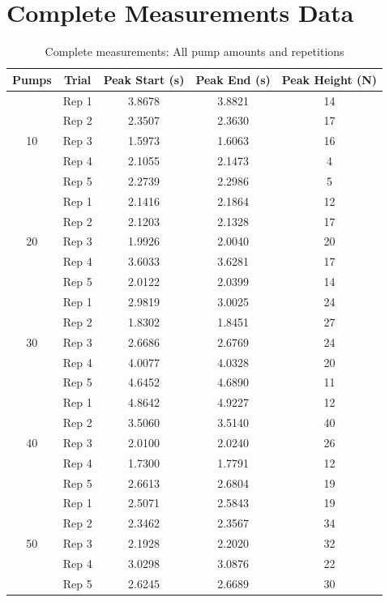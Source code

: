 \documentclass[11pt]{article}
\begin{document}
\section{Complete Measurements Data}

\begin{table}[H]
\centering
\caption{Complete measurements: All pump amounts and repetitions}
\begin{tabular}{|c|c|c|c|c|}
\hline
\textbf{Pumps} & \textbf{Trial} & \textbf{Peak Start (s)} & \textbf{Peak End (s)} & \textbf{Peak Height (N)} \\
\hline
\multirow{5}{*}{10} & Rep 1 & 3.8678 & 3.8821 & 14 \\
& Rep 2 & 2.3507 & 2.3630 & 17 \\
& Rep 3 & 1.5973 & 1.6063 & 16 \\
& Rep 4 & 2.1055 & 2.1473 & 4 \\
& Rep 5 & 2.2739 & 2.2986 & 5 \\
\hline
\multirow{5}{*}{20} & Rep 1 & 2.1416 & 2.1864 & 12 \\
& Rep 2 & 2.1203 & 2.1328 & 17 \\
& Rep 3 & 1.9926 & 2.0040 & 20 \\
& Rep 4 & 3.6033 & 3.6281 & 17 \\
& Rep 5 & 2.0122 & 2.0399 & 14 \\
\hline
\multirow{5}{*}{30} & Rep 1 & 2.9819 & 3.0025 & 24 \\
& Rep 2 & 1.8302 & 1.8451 & 27 \\
& Rep 3 & 2.6686 & 2.6769 & 24 \\
& Rep 4 & 4.0077 & 4.0328 & 20 \\
& Rep 5 & 4.6452 & 4.6890 & 11 \\
\hline
\multirow{5}{*}{40} & Rep 1 & 4.8642 & 4.9227 & 12 \\
& Rep 2 & 3.5060 & 3.5140 & 40 \\
& Rep 3 & 2.0100 & 2.0240 & 26 \\
& Rep 4 & 1.7300 & 1.7791 & 12 \\
& Rep 5 & 2.6613 & 2.6804 & 19 \\
\hline
\multirow{5}{*}{50} & Rep 1 & 2.5071 & 2.5843 & 19 \\
& Rep 2 & 2.3462 & 2.3567 & 34 \\
& Rep 3 & 2.1928 & 2.2020 & 32 \\
& Rep 4 & 3.0298 & 3.0876 & 22 \\
& Rep 5 & 2.6245 & 2.6689 & 30 \\
\hline
\end{tabular}
\label{tab:complete_measurements}
\end{table}
\end{document}

